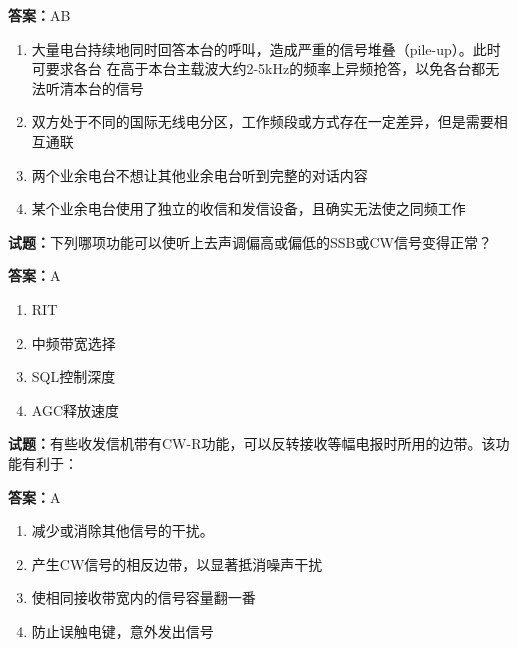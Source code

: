 \documentclass{ctexbook}
\begin{document}
\textbf{答案：}AB 

\begin{enumerate}[leftmargin=3em]
  \item 大量电台持续地同时回答本台的呼叫，造成严重的信号堆叠（pile-up）。此时可要求各台
在高于本台主载波大约2-5kHz的频率上异频抢答，以免各台都无法听清本台的信号 


  \item 双方处于不同的国际无线电分区，工作频段或方式存在一定差异，但是需要相互通联 

  \item 两个业余电台不想让其他业余电台听到完整的对话内容 

  \item 某个业余电台使用了独立的收信和发信设备，且确实无法使之同频工作 

\end{enumerate}





\vspace{1em}

\textbf{试题：}下列哪项功能可以使听上去声调偏高或偏低的SSB或CW信号变得正常？ 

\textbf{答案：}A 

\begin{enumerate}[leftmargin=3em]
  \item RIT 

  \item 中频带宽选择 

  \item SQL控制深度 

  \item AGC释放速度 

\end{enumerate}





\vspace{1em}

\textbf{试题：}有些收发信机带有CW-R功能，可以反转接收等幅电报时所用的边带。该功能有利于： 

\textbf{答案：}A 

\begin{enumerate}[leftmargin=3em]
  \item 减少或消除其他信号的干扰。 

  \item 产生CW信号的相反边带，以显著抵消噪声干扰 

  \item 使相同接收带宽内的信号容量翻一番 

  \item 防止误触电键，意外发出信号 

\end{enumerate}
\end{document}
